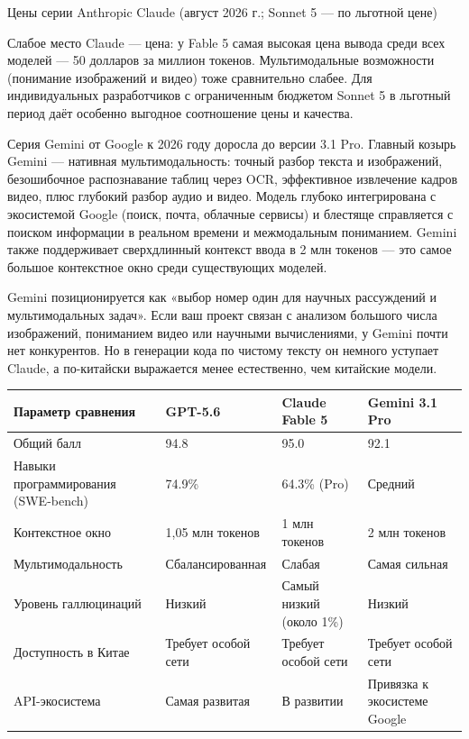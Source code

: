 \begin{center}\small\color{gray}Цены серии Anthropic Claude (август 2026 г.; Sonnet 5 — по льготной цене)\end{center}

Слабое место Claude — цена: у Fable 5 самая высокая цена вывода среди всех моделей — 50 долларов за миллион токенов. Мультимодальные возможности (понимание изображений и видео) тоже сравнительно слабее. Для индивидуальных разработчиков с ограниченным бюджетом Sonnet 5 в льготный период даёт особенно выгодное соотношение цены и качества.


Серия Gemini от Google к 2026 году доросла до версии 3.1 Pro. Главный козырь Gemini — нативная мультимодальность: точный разбор текста и изображений, безошибочное распознавание таблиц через OCR, эффективное извлечение кадров видео, плюс глубокий разбор аудио и видео. Модель глубоко интегрирована с экосистемой Google (поиск, почта, облачные сервисы) и блестяще справляется с поиском информации в реальном времени и межмодальным пониманием. Gemini также поддерживает сверхдлинный контекст ввода в 2 млн токенов — это самое большое контекстное окно среди существующих моделей.

Gemini позиционируется как «выбор номер один для научных рассуждений и мультимодальных задач». Если ваш проект связан с анализом большого числа изображений, пониманием видео или научными вычислениями, у Gemini почти нет конкурентов. Но в генерации кода по чистому тексту он немного уступает Claude, а по-китайски выражается менее естественно, чем китайские модели.

\begin{center}
\begin{tabularx}{\linewidth}{|X|X|X|X|}
\hline
\textbf{Параметр сравнения} & \textbf{GPT-5.6} & \textbf{Claude Fable 5} & \textbf{Gemini 3.1 Pro} \tabularnewline
\hline
Общий балл & 94.8 & 95.0 & 92.1 \tabularnewline
Навыки программирования (SWE-bench) & 74.9\% & 64.3\% (Pro) & Средний \tabularnewline
Контекстное окно & 1,05 млн токенов & 1 млн токенов & 2 млн токенов \tabularnewline
Мультимодальность & Сбалансированная & Слабая & Самая сильная \tabularnewline
Уровень галлюцинаций & Низкий & Самый низкий (около 1\%) & Низкий \tabularnewline
Доступность в Китае & Требует особой сети & Требует особой сети & Требует особой сети \tabularnewline
API-экосистема & Самая развитая & В развитии & Привязка к экосистеме Google \tabularnewline
\hline
\end{tabularx}
\end{center}

